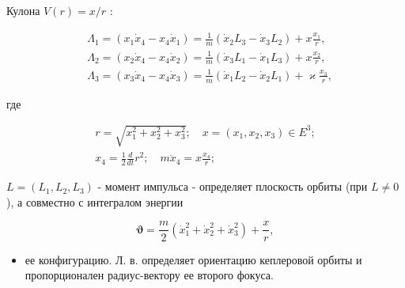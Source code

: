 \documentclass[10pt]{article}
\begin{document}
Кулона $V(r)=x / r$ :



\[

\begin{aligned}

& \Lambda_{1}=\left(x_{1} \dot{x}_{4}-x_{4} \dot{x}_{1}\right)=\frac{1}{m}\left(\dot{x}_{2} L_{3}-\dot{x}_{3} L_{2}\right)+x \frac{x_{1}}{r}, \\

& \Lambda_{2}=\left(x_{2} \dot{x}_{4}-x_{4} \dot{x}_{2}\right)=\frac{1}{m}\left(\dot{x}_{3} L_{1}-\dot{x}_{1} L_{3}\right)+x \frac{x_{2}}{r}, \\

& \Lambda_{3}=\left(x_{3} \dot{x}_{4}-x_{4} \dot{x}_{3}\right)=\frac{1}{m}\left(\dot{x}_{1} L_{2}-\dot{x}_{2} L_{1}\right)+\varkappa \frac{x_{3}}{r},

\end{aligned}

\]



где



\[

\begin{gathered}

r=\sqrt{x_{1}^{2}+x_{2}^{2}+x_{3}^{2}} ; \quad x=\left(x_{1}, x_{2}, x_{3}\right) \in E^{3} ; \\

x_{4}=\frac{1}{2} \frac{d}{d t} r^{2} ; \quad m \ddot{x}_{4}=x \frac{x_{4}}{r} ;

\end{gathered}

\]



$L=\left(L_{1}, L_{2}, L_{3}\right)$ - момент импульса - определяет плоскость орбиты (при $L \neq 0$ ), а совместно с интегралом энергии



\[

\boldsymbol{\vartheta}=\frac{m}{2}\left(\dot{x}_{1}^{2}+\dot{x}_{2}^{2}+\dot{x}_{3}^{2}\right)+\frac{x}{r},

\]



\begin{itemize}

  \item ее конфигурацию. Л. в. определяет ориентацию кеплеровой орбиты и пропорционален радиус-вектору ее второго фокуса.

\end{itemize}
\end{document}
